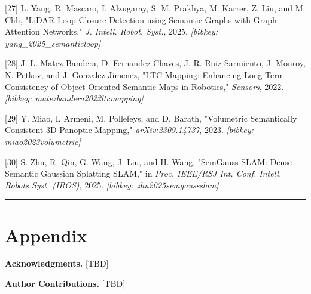 \documentclass[
]{article}
\begin{document}
{[}27{]} L. Yang, R. Mascaro, I. Alzugaray, S. M. Prakhya, M. Karrer, Z.
Liu, and M. Chli, "LiDAR Loop Closure Detection using Semantic Graphs
with Graph Attention Networks," \emph{J. Intell. Robot. Syst.}, 2025.
\emph{{[}bibkey: yang\_2025\_semanticloop{]}}

{[}28{]} J. L. Matez-Bandera, D. Fernandez-Chaves, J.-R. Ruiz-Sarmiento,
J. Monroy, N. Petkov, and J. Gonzalez-Jimenez, "LTC-Mapping: Enhancing
Long-Term Consistency of Object-Oriented Semantic Maps in Robotics,"
\emph{Sensors}, 2022. \emph{{[}bibkey: matezbandera2022ltcmapping{]}}

{[}29{]} Y. Miao, I. Armeni, M. Pollefeys, and D. Barath, "Volumetric
Semantically Consistent 3D Panoptic Mapping," \emph{arXiv:2309.14737},
2023. \emph{{[}bibkey: miao2023volumetric{]}}

{[}30{]} S. Zhu, R. Qin, G. Wang, J. Liu, and H. Wang, "SemGauss-SLAM:
Dense Semantic Gaussian Splatting SLAM," in \emph{Proc. IEEE/RSJ Int.
Conf. Intell. Robots Syst. (IROS)}, 2025. \emph{{[}bibkey:
zhu2025semgaussslam{]}}

\begin{center}\rule{0.5\linewidth}{0.5pt}\end{center}

\section{Appendix}\label{appendix}

\textbf{Acknowledgments.} {[}TBD{]}

\textbf{Author Contributions.} {[}TBD{]}
\end{document}
